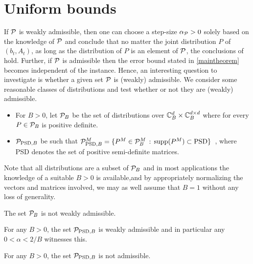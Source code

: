 \section{Uniform bounds}\label{sec:uniform}
If $\P$ is weakly admissible, then one can choose a step-size $\alpha_{\P}>0$ solely based on the knowledge of $\P$ and
conclude that no matter the joint distribution $P$ of $(b_t,A_t)$, as long as the distribution of $P$ is an element of $\P$, the conclusions of  hold. Further, if $\P$ is admissible then the error bound stated in  \cref{maintheorem} becomes independent of the instance. Hence, an interesting question to investigate is whether a given set $\P$ is (weakly) admissible. We consider some reasonable classes of distributions and test whether or not they are (weakly) admissible.
\begin{definition}\label{def:pclass}
\begin{itemize}[leftmargin=*, before = \leavevmode\vspace{-\baselineskip}]
\item For $B>0$, let $\P_B$ be the set of distributions over $\C_B^{d}\times \C_B^{\dcd}$ where for every $P\in \P_B$ is positive definite.
\item  $\P_{\text{PSD},B}$ be such that  $\P^M_{\text{PSD},B}=\{ P^M \in \P^M_B \,:\,  \supp(P^M)\subset \text{PSD} \}\,$ , where PSD denotes the set of positive semi-definite matrices.
\end{itemize}
\end{definition}
Note that all distributions are a subset of $\P_B$ and in most applications the knowledge of a suitable $B>0$ is available,and by appropriately normalizing the vectors and matrices involved, we may as well assume that $B=1$ without any loss of generality.
\begin{proposition}\label{notwad}
The set $\P_B$ is not weakly admissible.
\end{proposition}
\begin{proposition}\label{lm:ppsdbwd}
For any $B>0$, the set $\P_{\text{PSD},B}$ is weakly admissible
and in particular any $0<\alpha < 2/B$ witnesses this.
\end{proposition}
\begin{proposition}\label{lm:ppsdbna}
For any $B>0$, the set $\P_{\text{PSD},B}$ is not admissible.
\end{proposition}


